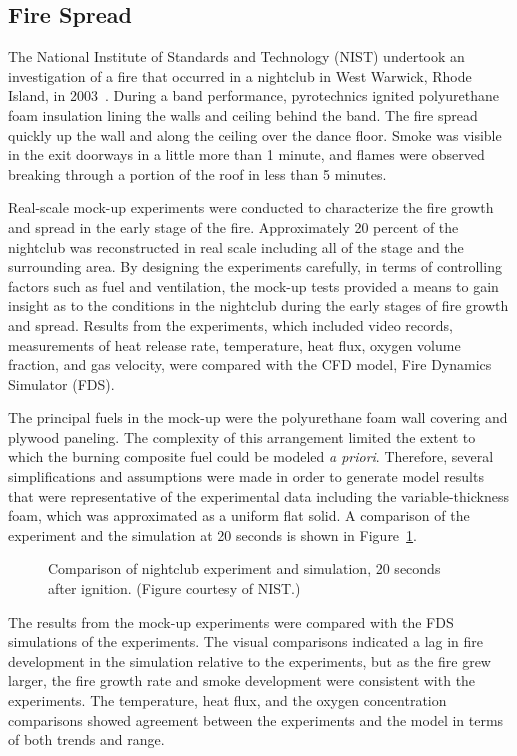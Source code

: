 \documentclass[graybox]{svmult}
\begin{document}
\subsection{Fire Spread}

The National Institute of Standards and Technology (NIST) undertook an investigation of a fire that occurred in a nightclub in West Warwick, Rhode Island, in 2003~\cite{Grosshandler}. During a band performance, pyrotechnics ignited polyurethane foam insulation lining the walls and ceiling behind the band. The fire spread quickly up the wall and along the ceiling over the dance floor. Smoke was visible in the exit doorways in a little more than 1 minute, and flames were observed breaking through a portion of the roof in less than 5 minutes.

Real-scale mock-up experiments were conducted to characterize the fire growth and spread in the early stage of the fire. Approximately 20 percent of the nightclub was reconstructed in real scale including all of the stage and the surrounding area. By designing the experiments carefully, in terms of controlling factors such as fuel and ventilation, the mock-up tests provided a means to gain insight as to the conditions in the nightclub during the early stages of fire growth and spread. Results from the experiments, which included video records, measurements of heat release rate, temperature, heat flux, oxygen volume fraction, and gas velocity, were compared with the CFD model, Fire Dynamics Simulator (FDS).

The principal fuels in the mock-up were the polyurethane foam wall covering and plywood paneling. The complexity of this arrangement limited the extent to which the burning composite fuel could be modeled {\em a priori}. Therefore, several simplifications and assumptions were made in order to generate model results that were representative of the experimental data including the variable-thickness foam, which was approximated as a uniform flat solid. A comparison of the experiment and the simulation at 20 seconds is shown in Figure~\ref{Station}.

\begin{figure}[b]
\caption{Comparison of nightclub experiment and simulation, 20 seconds after ignition. (Figure courtesy of NIST.)}
\label{Station}
\end{figure}

The results from the mock-up experiments were compared with the FDS simulations of the experiments. The visual comparisons indicated a lag in fire development in the simulation relative to the experiments, but as the fire grew larger, the fire growth rate and smoke development were consistent with the experiments. The temperature, heat flux, and the oxygen concentration comparisons showed agreement between the experiments and the model in terms of both trends and range.
\end{document}
